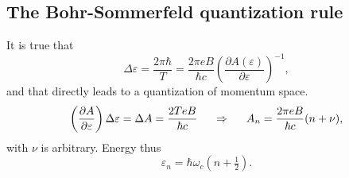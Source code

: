\subsection*{The Bohr-Sommerfeld quantization rule}

It is true that
\begin{equation*}
	\Delta \varepsilon = \frac{2 \pi \hbar}{T} = \frac{2 \pi e B}{\hbar c} \left(
		\frac{\partial A(\varepsilon)}{\partial \varepsilon} 
	\right)^{-1},
\end{equation*}
and that directly leads to a quantization of momentum space. 
\begin{equation*}
	\left(\frac{\partial A}{\partial \varepsilon} \right) \Delta \varepsilon = \Delta A = \frac{2 T e B}{\hbar c} \hspace{0.5cm} \Rightarrow \hspace{0.5cm}
	A_n = \frac{2 \pi e B}{\hbar c} (n + \nu),
\end{equation*}
with $\nu$ is arbitrary. Energy thus 
\begin{equation*}
	\varepsilon_n = \hbar \omega_c \left(n + \tfrac{1}{2}\right).
\end{equation*}



